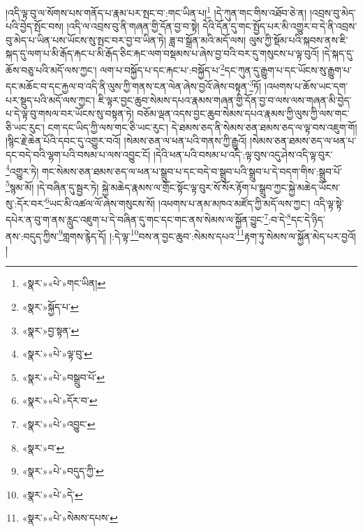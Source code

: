 །འདི་ལྟ་བུ་ལ་སོགས་པས་གནོད་པ་རྣམ་པར་སྤང་བ་:གང་ཡིན་པ།\footnote{«སྣར་»«པེ་»གང་ཡིན།} །དེ་ཀུན་གང་གིས་འཐོབ་ཅེ་ན། །འབྲས་བུ་མེད་པའི་བྱེད་སྤོང་བས། །འདི་ལ་འབྲས་བུ་ནི་གཞན་གྱི་དོན་བྱ་བ་སྟེ། དེའི་དོན་དུ་གང་སྤྱོད་པར་མི་འགྱུར་བ་དེ་ནི་འབྲས་བུ་མེད་པ་ཡིན་པས་ཡོངས་སུ་སྤང་བར་བྱ་བ་ཡིན་ཏེ། ཟླ་བ་སྒྲོན་མའི་མདོ་ལས། ལུས་ཀྱི་སྡོམ་པའི་སྐབས་ནས་ཇི་སྐད་དུ་ལག་པ་མི་རྒོད་རྐང་པ་མི་རྒོད་ཅིང་རྐང་ལག་བསྡམས་པ་ཞེས་བྱ་བའི་བར་དུ་གསུངས་པ་ལྟ་བུའོ། །དེ་སྐད་དུ་ཆོས་བཅུ་པའི་མདོ་ལས་ཀྱང་། ལག་པ་བསྐྱོད་པ་དང་རྐང་པ་:བསྐྱོད་པ་\footnote{«སྣར་»སྐྱོད་པ་}དང་ཀུན་དུ་རྒྱུག་པ་དང་ཡོངས་སུ་རྒྱུག་པ་དང་མཆོང་བ་དང་རྐྱལ་བ་འདི་ནི་ལུས་ཀྱི་གནས་ངན་ལེན་ཞེས་བྱའོ་ཞེས་བསྟན་\footnote{«སྣར་»བྱ་སྟན་}ཏོ། །འཕགས་པ་ཆོས་ཡང་དག་པར་སྡུད་པའི་མདོ་ལས་ཀྱང་། ཇི་ལྟར་བྱང་ཆུབ་སེམས་དཔའ་རྣམས་གཞན་གྱི་དོན་བྱ་བ་ལས་ལས་གཞན་མི་བྱེད་པ་དེ་ལྟ་བུ་གསལ་བར་ཡོངས་སུ་བསྟན་ཏེ། བཅོམ་ལྡན་འདས་བྱང་ཆུབ་སེམས་དཔའ་རྣམས་ཀྱི་ལུས་ཀྱི་ལས་གང་ཅི་ཡང་རུང་། ངག་དང་ཡིད་ཀྱི་ལས་གང་ཅི་ཡང་རུང་། དེ་ཐམས་ཅད་ནི་སེམས་ཅན་ཐམས་ཅད་ལ་ལྟ་བས་འཇུག་གོ། །སྙིང་རྗེ་ཆེན་པོའི་དབང་དུ་འགྱུར་བའོ། །སེམས་ཅན་ལ་ཕན་པའི་གནས་ཀྱི་རྒྱུའོ། །སེམས་ཅན་ཐམས་ཅད་ལ་ཕན་པ་དང་བདེ་བའི་ལྷག་པའི་བསམ་པ་ལས་འབྱུང་ངོ། །དེའི་ཕན་པའི་བསམ་པ་འདི་:ལྟ་བུས་འདུ་ཤེས་འདི་ལྟ་བུར་\footnote{«སྣར་»«པེ་»ལྟ་བུ་}འགྱུར་ཏེ། གང་སེམས་ཅན་ཐམས་ཅད་ལ་ཕན་པ་སྒྲུབ་པ་དང་བདེ་བ་སྒྲུབ་པའི་སྒྲུབ་པ་དེ་བདག་གིས་:སྒྲུབ་པོ་\footnote{«སྣར་»«པེ་»བསྒྲུབ་པོ་}སྙམ་མོ། །དེ་བཞིན་དུ་སྦྱར་ཏེ། སྐྱེ་མཆེད་རྣམས་ལ་གྲོང་སྟོང་ལྟ་བུར་སོ་སོར་རྟོག་པ་སྒྲུབ་ཀྱང་སྐྱེ་མཆེད་ཡོངས་སུ་:དོར་བར་\footnote{«སྣར་»«པེ་»དོར་བ་}ཡང་མི་འཚལ་ལོ་ཞེས་གསུངས་སོ། །འཕགས་པ་ནམ་མཁའ་མཛོད་ཀྱི་མདོ་ལས་ཀྱང་། འདི་ལྟ་སྟེ་དཔེར་ན་བུ་ག་ནས་རླུང་འཇུག་པ་དེ་བཞིན་དུ་གང་དང་གང་ནས་སེམས་ལ་སྐྱོན་བྱུང་\footnote{«སྣར་»«པེ་»འབྱུང་}:བ་དེ་\footnote{«སྣར་»བ་}དང་དེ་ཉིད་ནས་:བདུད་ཀྱིས་\footnote{«སྣར་»«པེ་»བདུད་ཀྱི་}གླགས་རྙེད་དོ། །:དེ་ལྟ་\footnote{«སྣར་»«པེ་»དེ་}བས་ན་བྱང་ཆུབ་:སེམས་དཔའ་\footnote{«སྣར་»«པེ་»སེམས་དཔས་}རྟག་ཏུ་སེམས་ལ་སྐྱོན་མེད་པར་བྱའོ། །
